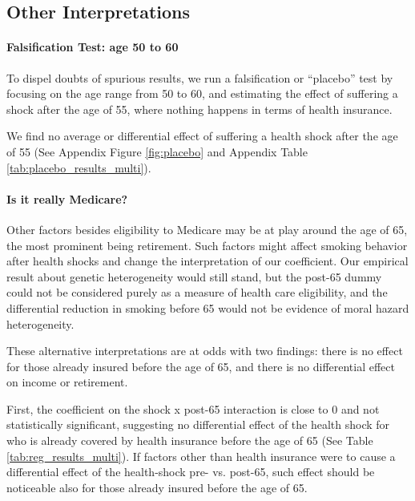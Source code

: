 \documentclass[11pt]{article}
\begin{document}
\subsection{Other Interpretations}\label{sec:interpret}

\paragraph{Falsification Test: age 50 to 60}
To dispel doubts of spurious results, we run a falsification or ``placebo'' test by focusing on the age range from 50 to 60, and estimating the effect of suffering a shock after the age of 55, where nothing happens in terms of health insurance.

We find no average or differential effect of suffering a health shock after the age of 55 (See Appendix Figure \ref{fig:placebo} and Appendix Table \ref{tab:placebo_results_multi}).%

\paragraph{Is it really Medicare?}
Other factors besides eligibility to Medicare may be at play around the age of 65, the most prominent being retirement.
Such factors might affect smoking behavior after health shocks and change the interpretation of our coefficient.
Our empirical result about genetic heterogeneity would still stand, but the post-65 dummy could not be considered purely as a measure of health care eligibility, and the differential reduction in smoking before 65 would not be evidence of moral hazard heterogeneity.

These alternative interpretations are at odds with two findings: there is no effect for those already insured before the age of 65, and there is no differential effect on income or retirement.

First, the coefficient on the \textsf{shock x post-65} interaction is close to 0 and not statistically significant, suggesting no differential effect of the health shock for who is already covered by health insurance before the age of 65 (See Table \ref{tab:reg_results_multi}).
If factors other than health insurance were to cause a differential effect of the health-shock pre- vs. post-65, such effect should be noticeable also for those already insured before the age of 65.
\end{document}
